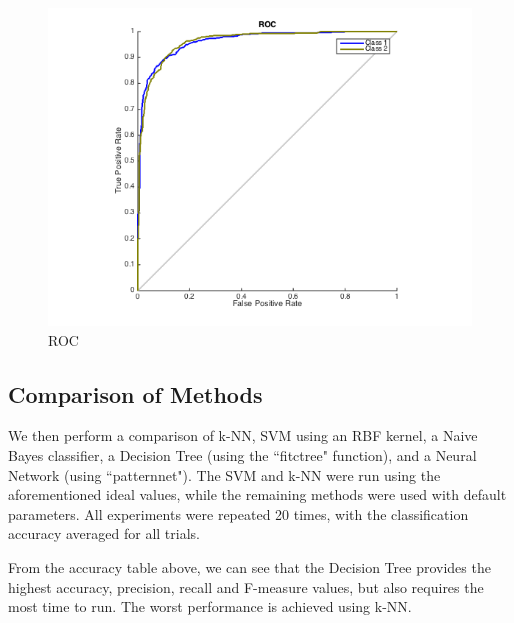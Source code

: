 \documentclass[]{article}
\begin{document}
\begin{figure}[h!]
	\centering
		\includegraphics[width=.8\linewidth]{../images-update/1-(3)-2.png}
		\caption{ROC}
		\label{fig:roc}	 
\end{figure}


\subsection{Comparison of Methods}
We then perform a comparison of k-NN, SVM using an RBF kernel, a Naive Bayes classifier, a Decision Tree (using the ``fitctree" function), and a Neural Network (using ``patternnet").  The SVM and k-NN were run using the aforementioned ideal values, while the remaining methods were used with default parameters.  All experiments were repeated 20 times, with the classification accuracy averaged for all trials.


From the accuracy table above, we can see that the Decision Tree provides the highest accuracy, precision, recall and F-measure values, but also requires the most time to run. The worst performance is achieved using k-NN.
\end{document}
